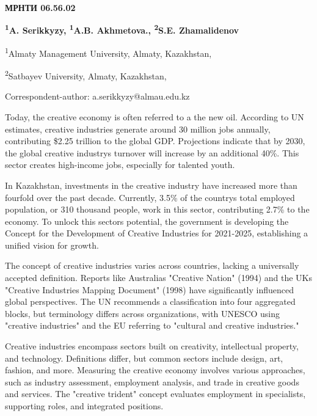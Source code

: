 \newpage
{\bfseries МРНТИ 06.56.02}


\begin{center}
{\bfseries \textsuperscript{1}A. Serikkyzy, \textsuperscript{1}A.B. Akhmetova., \textsuperscript{2}S.E. Zhamalidenov}

\textsuperscript{1}Almaty Management University, Almaty, Kazakhstan,

\textsuperscript{2}Satbayev University, Almaty, Kazakhstan,

Correspondent-author: a.serikkyzy@almau.edu.kz
\end{center}

Today, the creative economy is often referred to a the new oil.
According to UN estimates, creative industries generate around 30
million jobs annually, contributing \$2.25 trillion to the global GDP.
Projections indicate that by 2030, the global creative
industry\textquotesingle s turnover will increase by an additional 40\%.
This sector creates high-income jobs, especially for talented youth.

In Kazakhstan, investments in the creative industry have increased more
than fourfold over the past decade. Currently, 3.5\% of the
country\textquotesingle s total employed population, or 310 thousand
people, work in this sector, contributing 2.7\% to the economy. To
unlock this sector\textquotesingle s potential, the government is
developing the Concept for the Development of Creative Industries for
2021-2025, establishing a unified vision for growth.

The concept of creative industries varies across countries, lacking a
universally accepted definition. Reports like
Australia\textquotesingle s "Creative Nation" (1994) and the
UK\textquotesingle s "Creative Industries Mapping Document" (1998) have
significantly influenced global perspectives. The UN recommends a
classification into four aggregated blocks, but terminology differs
across organizations, with UNESCO using "creative industries" and the EU
referring to "cultural and creative industries."

Creative industries encompass sectors built on creativity, intellectual
property, and technology. Definitions differ, but common sectors include
design, art, fashion, and more. Measuring the creative economy involves
various approaches, such as industry assessment, employment analysis,
and trade in creative goods and services. The "creative trident" concept
evaluates employment in specialists, supporting roles, and integrated
positions.

